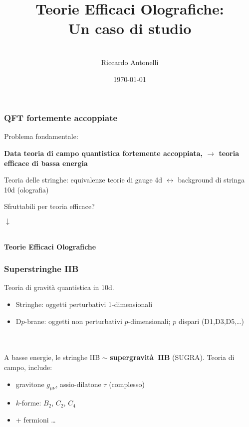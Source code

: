 \documentclass[aspectratio=43,mathserif]{beamer}
\title{Teorie Efficaci Olografiche:\\ Un caso di studio}
\author{\vspace{10pt}\\\large Riccardo Antonelli }
\date{\today}
\begin{document}
\begin{frame}
	\maketitle
\end{frame}

\begin{frame}
	\frametitle{QFT fortemente accoppiate}
	Problema fondamentale:
	\begin{center}\textbf{
		Data teoria di campo quantistica fortemente accoppiata, $\longrightarrow$ teoria efficace di bassa energia}
	\end{center}

	\vfill Teoria delle stringhe: equivalenze teorie di gauge 4d $\leftrightarrow$ background di stringa 10d (olografia)

	\vfill Sfruttabili per teoria efficace?

	\begin{center} $\downarrow$

		~\\

		\textbf{Teorie Efficaci Olografiche}
	\end{center}



\end{frame}

\begin{frame}
	\frametitle{Superstringhe IIB}
	Teoria di gravità quantistica in 10d.

	\begin{itemize}
		\item Stringhe: oggetti perturbativi 1-dimensionali
		\item D$p$-brane: oggetti non perturbativi $p$-dimensionali; $p$ dispari (D1,D3,D5,\ldots)
	\end{itemize}

	~\\~\\

	A basse energie, le stringhe IIB $\sim$ \textbf{supergravità~IIB} (SUGRA). Teoria di campo, include:

	\begin{itemize}
		\item gravitone $g_{\mu\nu}$, assio-dilatone $\tau$ (complesso)
		\item $k$-forme: $B_2$, $C_2$, $C_4$
		\item + fermioni \ldots
	\end{itemize}
\end{frame}
\end{document}
